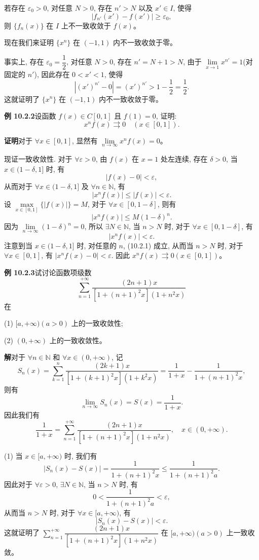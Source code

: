 \documentclass[UTF8,12pt,a4paper,fontset=fandol]{ctexart}
\begin{document}
若存在 $\varepsilon_0>0$, 对任意 $N>0$, 存在 $n'>N$ 以及 $x'\in I$, 使得
\[
  |f_{n'}(x')-f(x')|\geq\varepsilon_0,
\]
则 $\{f_n(x)\}$ 在 $I$ 上不一致收敛于 $f(x)$。

现在我们来证明 $\{x^n\}$ 在 $(-1,1)$ 内不一致收敛于零。

事实上, 存在 $\varepsilon_0=\dfrac12$, 对任意 $N>0$, 存在 $n'=N+1>N$, 由于 $\lim\limits_{x\to1}x^{n'}=1$(对固定的 $n'$), 因此存在 $0<x'<1$, 使得
\[
  |(x')^{n'}-0|=(x')^{n'}>1-\frac12=\frac12.
\]
这就证明了 $\{x^n\}$ 在 $(-1,1)$ 内不一致收敛于零。

\noindent\textbf{例 10.2.2}\quad 设函数 $f(x)\in C[0,1]$ 且 $f(1)=0$, 证明:
\[
  x^nf(x)\rightrightarrows0\quad(x\in[0,1]).
\]

\noindent\textbf{证明}\quad 对于 $\forall x\in[0,1]$, 显然有 $\lim\limits_{n\to\infty}x^nf(x)=0$。

现证一致收敛性. 对于 $\forall\varepsilon>0$, 由 $f(x)$ 在 $x=1$ 处左连续, 存在 $\delta>0$, 当 $x\in(1-\delta,1]$ 时, 有
\[
  |f(x)-0|<\varepsilon,
\]
从而对于 $\forall x\in(1-\delta,1]$ 及 $\forall n\in\mathbb N$, 有
\begin{equation}
  |x^nf(x)|\leq |f(x)|<\varepsilon.
  \tag{10.2.1}
\end{equation}
设 $\max\limits_{x\in[0,1]}\{|f(x)|\}=M$, 对于 $\forall x\in[0,1-\delta]$, 则有
\[
  |x^nf(x)|\leq M(1-\delta)^n.
\]
因为 $\lim\limits_{n\to\infty}(1-\delta)^n=0$, 所以 $\exists N\in\mathbb N$, 当 $n>N$ 时, 对于 $\forall x\in[0,1-\delta]$, 有
\[
  |x^nf(x)|<\varepsilon.
\]
注意到当 $x\in(1-\delta,1]$ 时, 对任意的 $n$, (10.2.1) 成立, 从而当 $n>N$ 时, 对于 $\forall x\in[0,1]$, 有 $|x^nf(x)-0|<\varepsilon$. 因此 $x^nf(x)\rightrightarrows0(x\in[0,1])$。

\noindent\textbf{例 10.2.3}\quad 试讨论函数项级数
\[
  \sum_{n=1}^{+\infty}\frac{(2n+1)x}{[1+(n+1)^2x](1+n^2x)}
\]
在

(1) $[a,+\infty)(a>0)$ 上的一致收敛性;

(2) $(0,+\infty)$ 上的一致收敛性。

\noindent\textbf{解}\quad 对于 $\forall n\in\mathbb N$ 和 $\forall x\in(0,+\infty)$, 记
\[
  S_n(x)=\sum_{k=1}^n\frac{(2k+1)x}{[1+(k+1)^2x](1+k^2x)}
  =\frac1{1+x}-\frac1{1+(n+1)^2x},
\]
则有
\[
  \lim_{n\to\infty}S_n(x)=S(x)=\frac1{1+x}.
\]
因此我们有
\[
  \frac1{1+x}=\sum_{n=1}^{+\infty}\frac{(2n+1)x}{[1+(n+1)^2x](1+n^2x)},\quad x\in(0,+\infty).
\]

(1) 当 $x\in[a,+\infty)$ 时, 我们有
\[
  |S_n(x)-S(x)|=\frac1{1+(n+1)^2x}\leq\frac1{1+(n+1)^2a}.
\]
因此对于 $\forall\varepsilon>0$, $\exists N\in\mathbb N$, 当 $n>N$ 时, 有
\[
  0<\frac1{1+(n+1)^2a}<\varepsilon,
\]
从而当 $n>N$ 时, 对于 $\forall x\in[a,+\infty)$, 有
\[
  |S_n(x)-S(x)|<\varepsilon.
\]
这就证明了 $\sum\limits_{n=1}^{+\infty}\dfrac{(2n+1)x}{[1+(n+1)^2x](1+n^2x)}$ 在 $[a,+\infty)(a>0)$ 上一致收敛。
\end{document}
